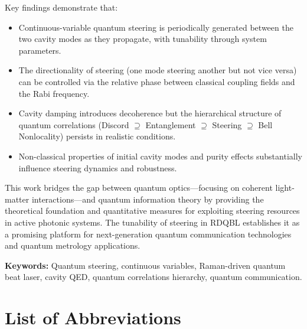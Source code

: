 \documentclass[12pt,a4paper]{report}
\begin{document}
Key findings demonstrate that:
\begin{itemize}
	\item Continuous-variable quantum steering is periodically generated between the two cavity modes as they propagate, with tunability through system parameters.
	\item The directionality of steering (one mode steering another but not vice versa) can be controlled via the relative phase between classical coupling fields and the Rabi frequency.
	\item Cavity damping introduces decoherence but the hierarchical structure of quantum correlations (Discord $\supseteq$ Entanglement $\supseteq$ Steering $\supseteq$ Bell Nonlocality) persists in realistic conditions.
	\item Non-classical properties of initial cavity modes and purity effects substantially influence steering dynamics and robustness.
\end{itemize}

This work bridges the gap between quantum optics—focusing on coherent light-matter interactions—and quantum information theory by providing the theoretical foundation and quantitative measures for exploiting steering resources in active photonic systems. The tunability of steering in RDQBL establishes it as a promising platform for next-generation quantum communication technologies and quantum metrology applications.

\textbf{Keywords:} Quantum steering, continuous variables, Raman-driven quantum beat laser, cavity QED, quantum correlations hierarchy, quantum communication.

\newpage

\chapter*{List of Abbreviations}
\end{document}
